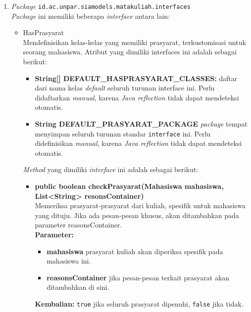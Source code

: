 \begin{enumerate}
	\item \textit{Package} \texttt{id.ac.unpar.siamodels.matakuliah.interfaces}\\
	\textit{Package} ini memiliki beberapa \textit{interface} antara lain:
	\begin{itemize}
		\item HasPrasyarat\\
		Mendefinisikan kelas-kelas yang memiliki prasyarat, terkustomisasi untuk seorang mahasiswa. Atribut yang dimiliki interfaces ini adalah sebagai berikut:
		\begin{itemize}
			\item \textbf{String[] DEFAULT\_HASPRASYARAT\_CLASSES:} daftar dari nama kelas \textit{default} seluruh turunan interface ini. Perlu didaftarkan \textit{manual}, karena \textit{Java reflection} tidak dapat mendeteksi otomatis.
			\item \textbf{String DEFAULT\_PRASYARAT\_PACKAGE} \textit{package} tempat menyimpan seluruh turunan standar \texttt{interface} ini. Perlu didefinisikan \textit{manual}, karena \textit{Java reflection} tidak dapat mendeteksi otomatis.
		\end{itemize}
		\textit{Method} yang dimiliki \textit{interface} ini adalah sebagai berikut:
		\begin{itemize}
			\item \textbf{public boolean checkPrasyarat(Mahasiswa mahasiswa, List<String> resonsContainer)}\\
			Memeriksa prasyarat-prasyarat dari kuliah, spesifik untuk mahasiswa yang dituju. Jika ada pesan-pesan khusus, akan ditambahkan pada parameter reasonsContainer.\\
			\textbf{Parameter:}
			\begin{itemize}
				\item \textbf{mahasiswa} prasyarat kuliah akan diperiksa spesifik pada mahasiswa ini.
				\item \textbf{reasonsContainer} jika pesan-pesan terkait prasyarat akan ditambahkan di sini.
			\end{itemize}
			\textbf{Kembalian:} \texttt{true} jika seluruh prasyarat dipenuhi, \texttt{false} jika tidak.
		\end{itemize}
	\end{itemize}
	

\end{enumerate}
